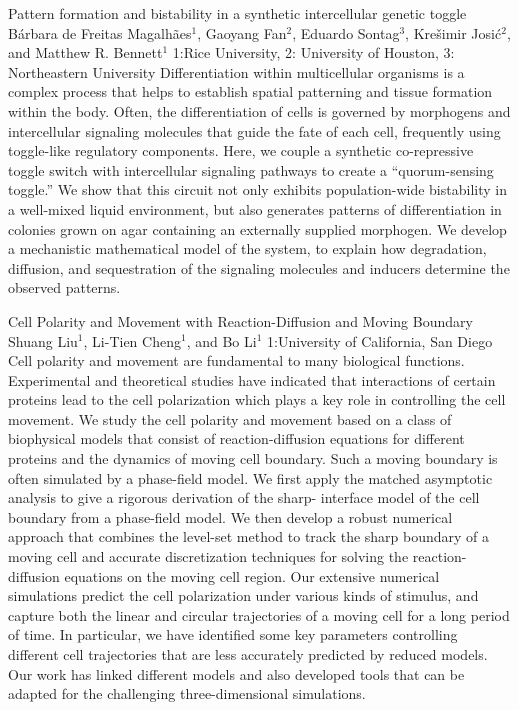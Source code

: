 \begin{addmargin}[2em]{0em}
\vspace{2ex}
\abs
{Pattern formation and bistability in a synthetic intercellular genetic toggle}
{B\'arbara de Freitas Magalh\~aes$^{1}$, Gaoyang Fan$^{2}$, Eduardo Sontag$^{3}$, Kre\v simir Josi\'c$^{2}$, and Matthew R. Bennett$^{1}$}
{1:Rice University, 2: University of Houston, 3: Northeastern University}
{Differentiation within multicellular organisms is a complex process that helps to establish spatial patterning and tissue formation within the body. Often, the differentiation of cells is governed by morphogens and intercellular signaling molecules that guide the fate of each cell, frequently using toggle-like regulatory components. Here, we couple a synthetic co-repressive toggle switch with intercellular signaling pathways to create a ``quorum-sensing toggle.'' We show that this circuit not only exhibits population-wide bistability in a well-mixed liquid environment, but also generates patterns of differentiation in colonies grown on agar containing an externally supplied morphogen. We develop a mechanistic mathematical model of the system, to explain how degradation, diffusion, and sequestration of the signaling molecules and inducers determine the observed patterns.}


\vspace{1.5ex}
\abs
{Cell Polarity and Movement with Reaction-Diffusion and Moving Boundary}
{Shuang Liu$^{1}$, Li-Tien Cheng$^{1}$, and Bo Li$^{1}$}
{1:University of California, San Diego}
{Cell polarity and movement are fundamental to many biological functions. Experimental and theoretical studies have indicated that interactions of certain proteins lead to the cell polarization which plays a key role in controlling the cell movement. We study the cell polarity and movement based on a class of biophysical models that consist of reaction-diffusion equations for different proteins and the dynamics of moving cell boundary. Such a moving boundary is often simulated by a phase-field model. We first apply the matched asymptotic analysis to give a rigorous derivation of the sharp- interface model of the cell boundary from a phase-field model. We then develop a robust numerical approach that combines the level-set method to track the sharp boundary of a moving cell and accurate discretization techniques for solving the reaction-diffusion equations on the moving cell region. Our extensive numerical simulations predict the cell polarization under various kinds of stimulus, and capture both the linear and circular trajectories of a moving cell for a long period of time. In particular, we have identified some key parameters controlling different cell trajectories that are less accurately predicted by reduced models. Our work has linked different models and also developed tools that can be adapted for the challenging three-dimensional simulations.}



\end{addmargin}
